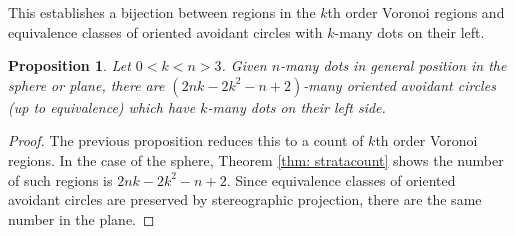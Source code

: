 \documentclass[11pt,oneside]{amsart}
\newtheorem{lemma}[thm]{Lemma}
\newtheorem{prop}[thm]{Proposition}
\theoremstyle{definition}
\theoremstyle{remark}
\numberwithin{equation}{section}
\begin{document}





This establishes a bijection between regions in the $k$th order Voronoi regions and equivalence classes of oriented avoidant circles with $k$-many dots on their left. %

\begin{prop}\label{prop: orientedavoidant}
Let $0<k<n>3$. Given $n$-many dots in general position in the sphere or plane, there are 
$
(2nk -2k^2 - n + 2)
$-many oriented avoidant circles (up to equivalence) which have $k$-many dots on their left side.
\end{prop}

\begin{proof}
The previous proposition reduces this to a count of $k$th order Voronoi regions. In the case of the sphere, Theorem \ref{thm: stratacount} shows the number of such regions is $2nk-2k^2-n+2$.
Since equivalence classes of oriented avoidant circles are preserved by stereographic projection, there are the same number in the plane.
\end{proof}
\end{document}
